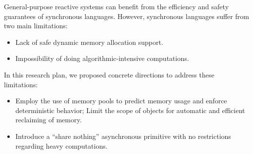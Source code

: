 \documentclass[pdftex,12pt,a4paper]{article}
\begin{document}
General-purpose reactive systems can benefit from the efficiency and safety 
guarantees of synchronous languages.
%
However, synchronous languages suffer from two main limitations:

\begin{itemize}
    \item Lack of safe dynamic memory allocation support.
    \item Impossibility of doing algorithmic-intensive computations.
\end{itemize}

In this research plan, we proposed concrete directions to address these 
limitations:

\begin{itemize}
    \item Employ the use of memory pools to predict memory usage and enforce 
    deterministic behavior;
    Limit the scope of objects for automatic and efficient reclaiming of 
    memory.
    \item Introduce a ``share nothing'' asynchronous primitive with no 
    restrictions regarding heavy computations.
\end{itemize}
 
\end{document}
